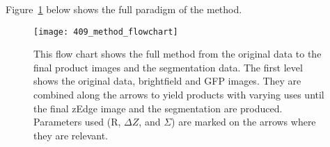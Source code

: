 Figure~\ref{fig:flowchart} below shows the full paradigm of the method.
\begin{figure}[h!]
 \centering
 \texttt{[image: 409\_method\_flowchart]}
 \caption[Method flow chart]{
 	This flow chart shows the full method from the original data to the final product images and the segmentation data. The first level shows the original data, brightfield and GFP images. They are combined along the arrows to yield products with varying uses until the final zEdge image and the segmentation are produced. Parameters used (R, $\Delta Z$, and $\Sigma$) are marked on the arrows where they are relevant.
 }
 \label{fig:flowchart}
\end{figure}
